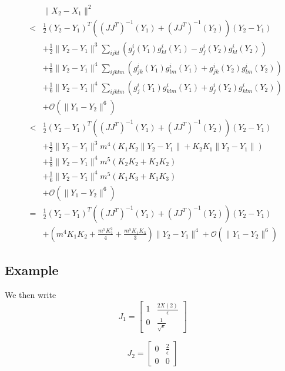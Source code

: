 \documentclass[12pt]{article}
\begin{document}
\begin{eqnarray}
&&\| X_2 - X_1 \|^2 \\
&<& \frac{1}{2} (Y_2 - Y_1 )^T ((J J^T)^{-1} (Y_1) + (J J^T)^{-1}(Y_2)) (Y_2 - Y_1 ) \\
&& + \frac{1}{2} \|Y_2 - Y_1 \|^3 \sum_{ijkl} \left( g_j^i (Y_1) g^i_{kl} (Y_1) - g_j^i (Y_2) g^i_{kl} (Y_2) \right) \\
&& + \frac{1}{8} \|Y_2 - Y_1 \|^4 \sum_{ijklm}  \left( g^i_{jk} (Y_1) g^i_{lm} (Y_1) + g^i_{jk} (Y_2) g^i_{lm} (Y_2)  \right) \\
&& + \frac{1}{6} \|Y_2 - Y_1 \|^4 \sum_{ijklm}  \left( g^i_{j} (Y_1) g^i_{klm} (Y_1) + g^i_{j} (Y_2) g^i_{klm} (Y_2)  \right) \\
&& + \mathcal{O} (\|Y_1 - Y_2 \|^6 ) \\
&<& \frac{1}{2} (Y_2 - Y_1 )^T ((J J^T)^{-1} (Y_1) + (J J^T)^{-1}(Y_2)) (Y_2 - Y_1 ) \\
&& + \frac{1}{2} \|Y_2 - Y_1 \|^3 m^4 \left( K_1 K_2 \|Y_2 - Y_1\| + K_2 K_1 \|Y_2 - Y_1 \| \right) \\
&& + \frac{1}{8} \|Y_2 - Y_1 \|^4 m^5 \left( K_2 K_2 + K_2 K_2  \right) \\
&& + \frac{1}{6} \|Y_2 - Y_1 \|^4 m^5  \left( K_1 K_3 + K_1 K_3  \right) \\
&& + \mathcal{O} (\|Y_1 - Y_2 \|^6 ) \\
&=& \frac{1}{2} (Y_2 - Y_1 )^T ((J J^T)^{-1} (Y_1) + (J J^T)^{-1}(Y_2)) (Y_2 - Y_1 ) \\
&&+ \left( m^4 K_1 K_2 + \frac{m^5 K_2^2}{4} + \frac{m^5 K_1 K_3}{3} \right) \|Y_2 - Y_1 \|^4 
+ \mathcal{O} (\|Y_1 - Y_2 \|^6 )
\end{eqnarray}


\subsection{Example}

We then write
\begin{equation}
J_1 = \begin{bmatrix}
1 & \frac{2X(2)}{\epsilon} \\
0 & \frac{1}{\sqrt{\epsilon}}
\end{bmatrix}
\end{equation}

\begin{equation}
J_2 = \begin{bmatrix}
0 & \frac{2}{\epsilon} \\
0 & 0
\end{bmatrix}
\end{equation}
\end{document}
